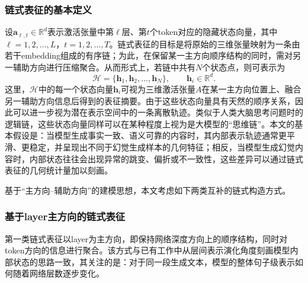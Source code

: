 \subsubsection{链式表征的基本定义}

设$\mathbf{a}_{\ell,t} \in \mathbb{R}^{d}$表示激活张量中第$\ell$层、第$t$个token对应的隐藏状态向量，其中$\ell = 1,2,\dots,L$，$t = 1,2,\dots,T$。链式表征的目标是将原始的三维张量映射为一条由若干embedding组成的有序链；为此，在保留某一主方向顺序结构的同时，需对另一辅助方向进行压缩聚合。从而形式上，若链中共有$N$个状态点，则可表示为
\begin{equation}
  \label{eq:chain_representation}
  \mathcal{H} = \{\mathbf{h}_1,\mathbf{h}_2,\dots,\mathbf{h}_N\}, \qquad \mathbf{h}_i \in \mathbb{R}^{d}.
\end{equation}
这里，$\mathcal{H}$中的每一个状态向量$\mathbf{h}_i$可视为三维激活张量$A$在某一主方向位置上、融合另一辅助方向信息后得到的表征摘要。由于这些状态向量具有天然的顺序关系，因此可以进一步视为潜在表示空间中的一条离散轨迹。类似于人类大脑思考问题时的逻辑链，这些状态向量同样可以在某种程度上视为是大模型的“思维链”。本文的基本假设是：当模型生成事实一致、语义可靠的内容时，其内部表示轨迹通常更平滑、更稳定，并呈现出不同于幻觉生成样本的几何特征；相反，当模型生成幻觉内容时，内部状态往往会出现异常的跳变、偏折或不一致性，这些差异可以通过链式表征的几何统计量加以刻画。

基于“主方向--辅助方向”的建模思想，本文考虑如下两类互补的链式构造方式。

\subsubsection{基于layer主方向的链式表征}

第一类链式表征以layer为主方向，即保持网络深度方向上的顺序结构，同时对token方向的信息进行聚合。该方式与已有工作\cite{wang2025latent}中从层间表示演化角度刻画模型内部状态的思路一致，其关注的是：对于同一段生成文本，模型的整体句子级表示如何随着网络层数逐步变化。

